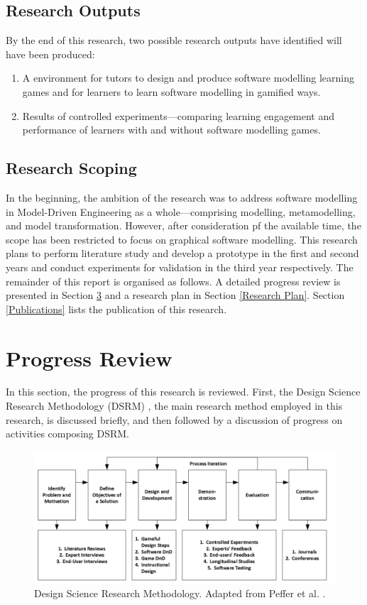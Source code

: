 \documentclass[10pt, a4paper]{report} \usepackage[titletoc]{appendix}
\begin{document}
\section{Research Outputs}
By the end of this research, two possible research outputs have identified will have been produced:
\begin{enumerate}
\item A environment for tutors to design and produce software modelling learning games and for learners to learn software modelling in gamified ways. 
\item Results of controlled experiments---comparing learning engagement and performance of learners with and without software modelling games.
\end{enumerate}

\section{Research Scoping}
In the beginning, the ambition of the research was to address software modelling in Model-Driven Engineering as a whole---comprising modelling, metamodelling, and model transformation. However, after consideration pf the available time, the scope has been restricted to focus on graphical software modelling. This research plans to perform literature study and develop a prototype in the first and second years and conduct experiments for validation in the third year respectively.\newline\newline
The remainder of this report is organised as follows. A detailed
progress review is presented in Section \ref{Progres Review} and a research plan in Section \ref{Research Plan}. Section \ref{Publications} lists the publication of this research.

\chapter{Progress Review}
\label{Progres Review}
In this section, the progress of this research is reviewed. First, the Design Science Research Methodology (DSRM) \cite{peffers2007design}, the main research method employed in this research, is discussed briefly, and then followed by a discussion of progress on activities composing DSRM.

\begin{figure}[th] \centering \includegraphics[width=\textwidth]{dsrm}
\caption{Design Science Research Methodology. Adapted from Peffer et al. \cite{peffers2007design}.}
\label{dsrm}
\end{figure}
\end{document}
